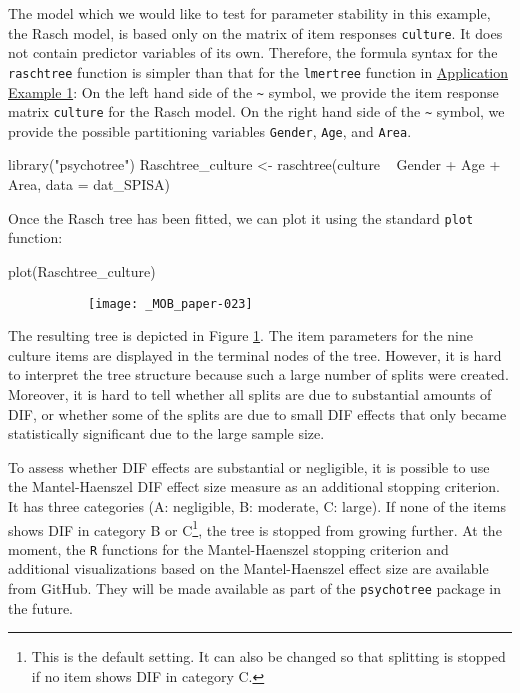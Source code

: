 \documentclass[doc,floatsintext,natbib]{apa7}
\begin{document}
The model which we would like to test for parameter stability in this example, the Rasch model, is based only on the matrix of item responses \texttt{culture}. It does not contain predictor variables of its own. Therefore, the formula syntax for the \texttt{raschtree} function is simpler than that for the \texttt{lmertree} function in \hyperref[sec:TutorialMixed]{Application Example 1}: On the left hand side of the \verb|~| symbol, we provide the item response matrix \texttt{culture} for the Rasch model. On the right hand side of the \verb|~| symbol, we provide the possible partitioning variables \texttt{Gender}, \texttt{Age}, and \texttt{Area}.



\begin{Schunk}
\begin{Sinput}
 library("psychotree")
 Raschtree_culture <- raschtree(culture ~  Gender + Age + Area,
                                data = dat_SPISA)
\end{Sinput}
\end{Schunk}


Once the Rasch tree has been fitted, we can plot it using the standard \texttt{plot} function: 

\begin{Schunk}
\begin{Sinput}
 plot(Raschtree_culture)
\end{Sinput}
\end{Schunk}

\begin{figure}%
\caption{Rasch tree fitted to the SPISA quiz items using the default stopping criterion based on statistical significance.}
\begin{subfigure}{1.2\textwidth}
\texttt{[image: \_MOB\_paper-023]}
\end{subfigure}
\label{fig:MHtree1}
\end{figure}%

The resulting tree is depicted in Figure \ref{fig:MHtree1}. The item parameters for the nine culture items are displayed in the terminal nodes of the tree. However, it is hard to interpret the tree structure because such a large number of splits were created. Moreover, it is hard to tell whether all splits are due to substantial amounts of DIF, or whether some of the splits are due to small DIF effects that only became statistically significant due to the large sample size.

To assess whether DIF effects are substantial or negligible, it is possible to use the Mantel-Haenszel DIF effect size measure as an additional stopping criterion. It has three categories (A: negligible, B: moderate, C: large). If none of the items shows DIF in category B or C\footnote{This is the default setting. It can also be changed so that splitting is stopped if no item shows DIF in category C.}, the tree is stopped from growing further.
At the moment, the \texttt{R} functions for the Mantel-Haenszel stopping criterion and additional visualizations based on the Mantel-Haenszel effect size are available from GitHub. They will be made available as part of the \texttt{psychotree} package in the future.
\end{document}
